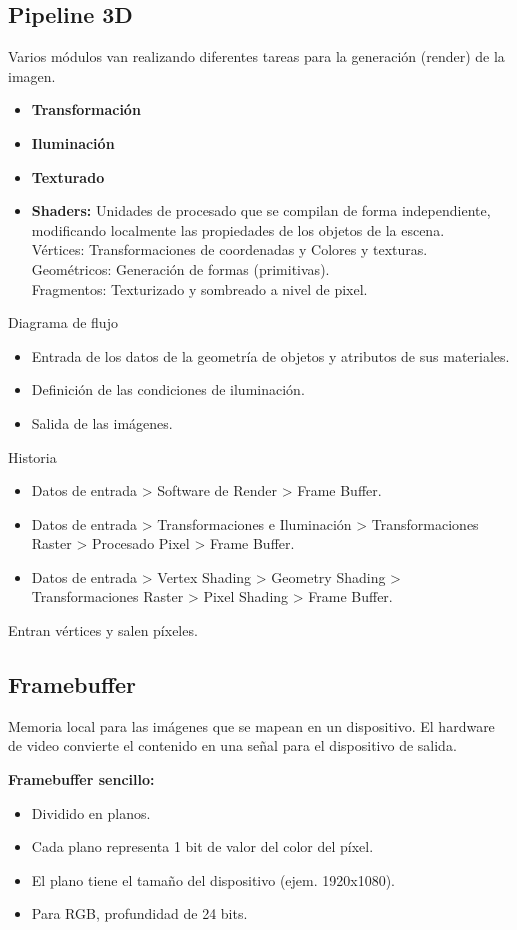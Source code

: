\subsection{Pipeline 3D}\label{subsec:pipeline-3d}
Varios módulos van realizando diferentes tareas para la generación (render) de la imagen.
\begin{itemize}
	\item \textbf{Transformación}
	\item \textbf{Iluminación}
	\item \textbf{Texturado}
	\item \textbf{Shaders:} Unidades de procesado que se compilan de forma independiente, modificando localmente las propiedades de los objetos de la escena. \\ Vértices: Transformaciones de coordenadas y Colores y texturas. \\ Geométricos: Generación de formas (primitivas). \\ Fragmentos: Texturizado y sombreado a nivel de pixel.
\end{itemize}
Diagrama de flujo
\begin{itemize}
	\item Entrada de los datos de la geometría de objetos y atributos de sus materiales.
	\item Definición de las condiciones de iluminación.
	\item Salida de las imágenes.
\end{itemize}
Historia
\begin{itemize}
	\item Datos de entrada > Software de Render > Frame Buffer.
	\item Datos de entrada > Transformaciones e Iluminación > Transformaciones Raster > Procesado Pixel > Frame Buffer.
	\item Datos de entrada > Vertex Shading > Geometry Shading > Transformaciones Raster > Pixel Shading > Frame Buffer.
\end{itemize}

Entran vértices y salen píxeles.

\subsection{Framebuffer}\label{subsec:framebuffer}
Memoria local para las imágenes que se mapean en un dispositivo. El hardware de video convierte el contenido en una señal para el dispositivo de salida.

\textbf{Framebuffer sencillo:}
\begin{itemize}
	\item Dividido en planos.
	\item Cada plano representa 1 bit de valor del color del píxel.
	\item El plano tiene el tamaño del dispositivo (ejem. 1920x1080).
	\item Para RGB, profundidad de 24 bits.
\end{itemize}


